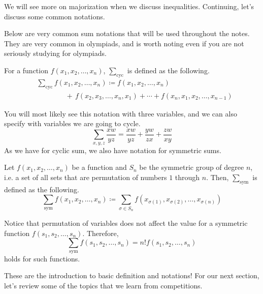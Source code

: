 \documentclass[../../../main.tex]{subfiles}
\begin{document}
We will see more on majorization when we discuss inequalities.
Continuing, let's discuss some common notations.

Below are very common sum notations that will be used throughout
the notes. They are very common in olympiads, and is worth noting
even if you are not seriously studying for olympiads.

\begin{definition}{}{}
For a function $f(x_1, x_2, \ldots, x_n)$, $\sum_\text{cyc}$ is
defined as the following.
\vspace{-0.5\baselineskip}
\begin{align*}
    &\sum_\text{cyc} f(x_1, x_2, \ldots, x_n)
    \coloneqq f(x_1, x_2, \ldots, x_n) \\[-0.8em]
    &\qquad\qquad + \, f(x_2, x_3, \ldots, x_n, x_1) +
        \cdots + f(x_n, x_1, x_2, \ldots, x_{n-1})
\end{align*}
\end{definition}

You will most likely see this notation with three variables, and
we can also specify with variables we are going to cycle.
\[
\sum_{x,y,z} \frac{xw}{yz}
= \frac{xw}{yz} + \frac{yw}{zx} + \frac{zw}{xy}
\]
As we have for cyclic sum, we also have notation for symmetric sums.

\begin{definition}{}{}
Let $f(x_1, x_2, \ldots, x_n)$ be a function and $S_n$ be the
symmetric group of degree $n$, i.e. a set of all sets that are
permutation of numbers $1$ through $n$. Then, $\sum_\text{sym}$ is
defined as the following.
\[
\sum_\text{sym} f(x_1, x_2, \ldots, x_n)
\coloneqq \sum_{\sigma \in S_n}
    f(x_{\sigma(1)}, x_{\sigma(2)}, \ldots, x_{\sigma(n)})
\]
\end{definition}

Notice that permutation of variables does not affect the value for
a symmetric function $f(s_1, s_2, \ldots, s_n)$. Therefore,
\[
\sum_\text{sym} f(s_1, s_2, \ldots, s_n)
= n! f(s_1, s_2, \ldots, s_n)
\]
holds for such functions.

These are the introduction to basic definition and notations!
For our next section, let's review some of the topics that we
learn from competitions.
\end{document}
